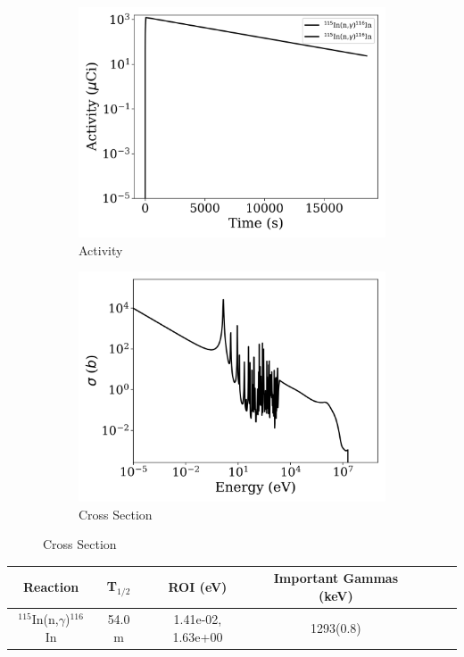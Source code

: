 \begin{figure}[h]
\centering
\begin{subfigure}{.5\textwidth}
  \centering
     \includegraphics[width=.8\textwidth]{plot/In-115(n,gamma)In-116_wisconsin1} 

  \caption{Activity}
\end{subfigure}%
\begin{subfigure}{.5\textwidth}
  \centering
     \includegraphics[width=.8\textwidth]{plot/In-115(n,gamma)In-116} 

  \caption{Cross Section}
\end{subfigure}
\end{figure}

\begin{table}[h]
\centering
\begin{tabular}{ |c|c|c|c|c|c|c| }
 \hline
 Reaction & T$_{1/2}$ & ROI (eV) & Important Gammas (keV) \\
 \hline 
 $^{115}$In(n,$\gamma$)$^{116}$In & 54.0 m & 1.41e-02, 1.63e+00 & 1293(0.8) \\ 
\hline
\end{tabular}
\end{table}
